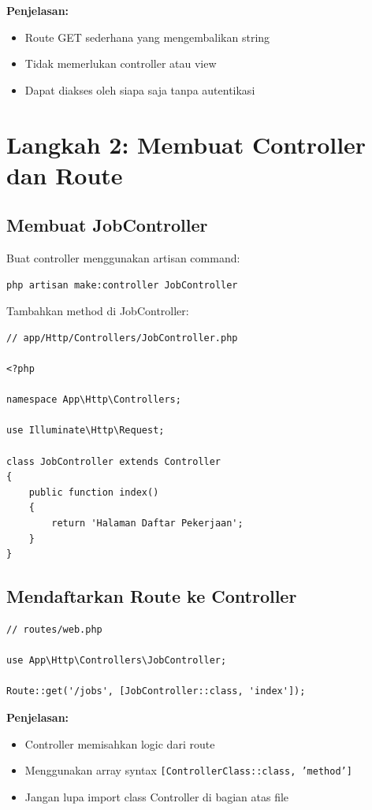 \documentclass[a4paper,oneside,11pt]{book}
\begin{document}
\textbf{Penjelasan:}
\begin{itemize}
    \item Route GET sederhana yang mengembalikan string
    \item Tidak memerlukan controller atau view
    \item Dapat diakses oleh siapa saja tanpa autentikasi
\end{itemize}

\section{Langkah 2: Membuat Controller dan Route}

\subsection{Membuat JobController}

Buat controller menggunakan artisan command:

\begin{lstlisting}[language=bash]
php artisan make:controller JobController
\end{lstlisting}

Tambahkan method di JobController:

\begin{lstlisting}[style=phpstyle]
// app/Http/Controllers/JobController.php

<?php

namespace App\Http\Controllers;

use Illuminate\Http\Request;

class JobController extends Controller
{
    public function index()
    {
        return 'Halaman Daftar Pekerjaan';
    }
}
\end{lstlisting}

\subsection{Mendaftarkan Route ke Controller}

\begin{lstlisting}[style=phpstyle]
// routes/web.php

use App\Http\Controllers\JobController;

Route::get('/jobs', [JobController::class, 'index']);
\end{lstlisting}

\textbf{Penjelasan:}
\begin{itemize}
    \item Controller memisahkan logic dari route
    \item Menggunakan array syntax \texttt{[ControllerClass::class, 'method']}
    \item Jangan lupa import class Controller di bagian atas file
\end{itemize}
\end{document}
